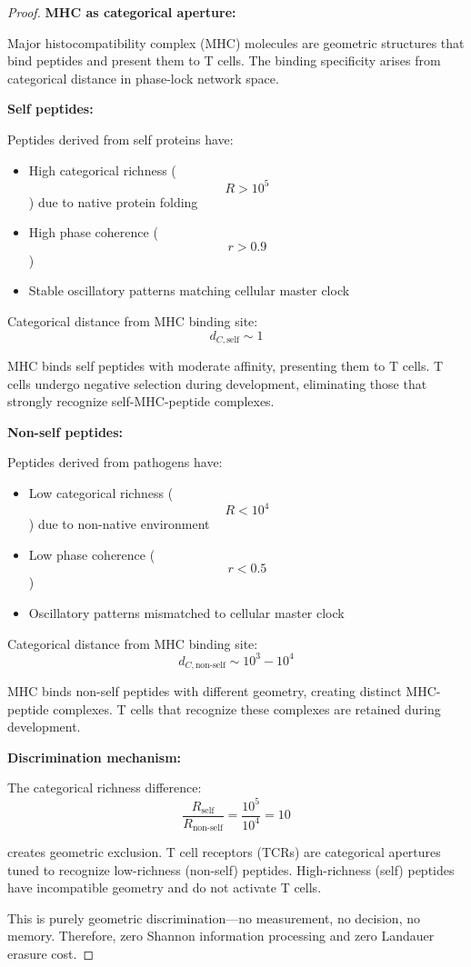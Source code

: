 \documentclass[12pt,a4paper]{article}
\begin{document}
\begin{proof}
\textbf{MHC as categorical aperture:}

Major histocompatibility complex (MHC) molecules are geometric structures that bind peptides and present them to T cells. The binding specificity arises from categorical distance in phase-lock network space.

\textbf{Self peptides:}

Peptides derived from self proteins have:
\begin{itemize}
\item High categorical richness ($$R > 10^5$$) due to native protein folding
\item High phase coherence ($$r > 0.9$$)
\item Stable oscillatory patterns matching cellular master clock
\end{itemize}

Categorical distance from MHC binding site:
$$
d_{C, \text{self}} \sim 1
$$

MHC binds self peptides with moderate affinity, presenting them to T cells. T cells undergo negative selection during development, eliminating those that strongly recognize self-MHC-peptide complexes.

\textbf{Non-self peptides:}

Peptides derived from pathogens have:
\begin{itemize}
\item Low categorical richness ($$R < 10^4$$) due to non-native environment
\item Low phase coherence ($$r < 0.5$$)
\item Oscillatory patterns mismatched to cellular master clock
\end{itemize}

Categorical distance from MHC binding site:
$$
d_{C, \text{non-self}} \sim 10^3 - 10^4
$$

MHC binds non-self peptides with different geometry, creating distinct MHC-peptide complexes. T cells that recognize these complexes are retained during development.

\textbf{Discrimination mechanism:}

The categorical richness difference:
$$
\frac{R_{\text{self}}}{R_{\text{non-self}}} = \frac{10^5}{10^4} = 10
$$

creates geometric exclusion. T cell receptors (TCRs) are categorical apertures tuned to recognize low-richness (non-self) peptides. High-richness (self) peptides have incompatible geometry and do not activate T cells.

This is purely geometric discrimination—no measurement, no decision, no memory. Therefore, zero Shannon information processing and zero Landauer erasure cost.
\end{proof}
\end{document}
